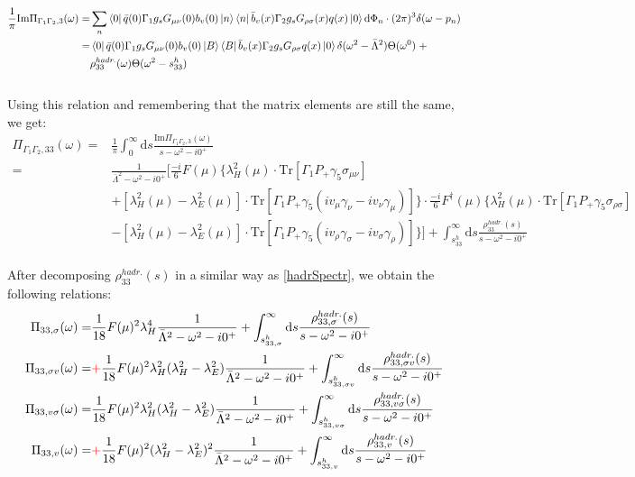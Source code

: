 \documentclass[openright,twoside,12pt,a4paper,final]{article}
\begin{document}
	\begin{align}
		\frac{1}{\pi} \mathrm{Im} \Pi_{\Gamma_1 \Gamma_2,3}(\omega) =& \sum_n \bra{0} \bar{q}(0) \Gamma_1 g_s G_{\mu \nu}(0) b_v(0)\ket{n} \bra{n} \bar{b}_v(x) \Gamma_2 g_s G_{\rho \sigma}(x) q(x) \ket{0} \mathrm{d} \Phi_n \cdot (2\pi)^3 \delta(\omega - p_n) \nonumber \\ =& \bra{0} \bar{q}(0) \Gamma_1 g_s G_{\mu \nu}(0) b_v(0)\ket{B} \bra{B} \bar{b}_v(x) \Gamma_2 g_s G_{\rho \sigma} q(x) \ket{0} \delta(\omega^2 - \bar{\Lambda}^2) \Theta(\omega^0) \; + \nonumber \\& \rho_{33}^{hadr.}(\omega) \Theta(\omega^2 - s_{33}^h)
	\end{align} \\
	Using this relation and remembering that the matrix elements are still the same, we get: \\
	\begin{align}
		\Pi_{\Gamma_1 \Gamma_2,33}(\omega) =& \frac{1}{\pi} \int_0^{\infty} \mathrm{d}s \frac{\mathrm{Im} \Pi_{\Gamma_1 \Gamma_2,3}(\omega)}{s - \omega^2 - i0^+} \nonumber \\ =& \frac{1}{\bar{\Lambda}^2 - \omega^2 - i0^+} \Big[\frac{-i}{6} F(\mu) \{\lambda_H^2(\mu) \cdot \mathrm{Tr}[\Gamma_1 P_+ \gamma_5 \sigma_{\mu \nu}] \nonumber \\& + [\lambda_H^2(\mu) - \lambda_E^2(\mu)] \cdot \mathrm{Tr}[\Gamma_1 P_+ \gamma_5 (i v_{\mu} \gamma_{\nu} - i v_{\nu} \gamma_{\mu})]\} \cdot \frac{-i}{6} F^{\dagger}(\mu) \{\lambda_H^2(\mu) \cdot \mathrm{Tr}[\Gamma_1 P_+ \gamma_5 \sigma_{\rho \sigma}] \nonumber \\& - [\lambda_H^2(\mu) - \lambda_E^2(\mu)] \cdot \mathrm{Tr}[\Gamma_1 P_+ \gamma_5 (i v_{\rho} \gamma_{\sigma} - i v_{\sigma} \gamma_{\rho})]\} \Big] + \int_{s_{33}^h}^{\infty} \mathrm{d} s \frac{\rho_{33}^{hadr.}(s)}{s - \omega^2 - i0^+} 
	\end{align} \\
	After decomposing $\rho_{33}^{hadr.}(s)$ in a similar way as \eqref{hadrSpectr}, we obtain the following relations: \\
	\begin{align}
		\Pi_{33,\sigma}(\omega) =& \frac{1}{18} F(\mu)^2 \lambda_H^4 \frac{1}{\bar{\Lambda}^2 - \omega^2 - i0^+} + \int_{s_{33,\sigma}^h}^{\infty} \mathrm{d}s \frac{\rho_{33,\sigma}^{hadr.}(s)}{s - \omega^2 - i0^+} \\
		\Pi_{33,\sigma v}(\omega) =& \textcolor{red}{+} \frac{1}{18} F(\mu)^2 \lambda_H^2 (\lambda_H^2 - \lambda_E^2) \frac{1}{\bar{\Lambda}^2 - \omega^2 - i0^+} + \int_{s_{33,\sigma v}^h}^{\infty} \mathrm{d}s \frac{\rho_{33,\sigma v}^{hadr.}(s)}{s - \omega^2 - i0^+} \\
		\Pi_{33,v \sigma}(\omega) =& \frac{1}{18} F(\mu)^2 \lambda_H^2 (\lambda_H^2 - \lambda_E^2) \frac{1}{\bar{\Lambda}^2 - \omega^2 - i0^+} + \int_{s_{33,v \sigma}^h}^{\infty} \mathrm{d}s \frac{\rho_{33,v \sigma}^{hadr.}(s)}{s - \omega^2 - i0^+} \\
		\Pi_{33,v}(\omega) =& \textcolor{red}{+} \frac{1}{18} F(\mu)^2 (\lambda_H^2 - \lambda_E^2)^2 \frac{1}{\bar{\Lambda}^2 - \omega^2 - i0^+} + \int_{s_{33, v}^h}^{\infty} \mathrm{d}s \frac{\rho_{33, v}^{hadr.}(s)}{s - \omega^2 - i0^+}
	\end{align} \\
\end{document}
